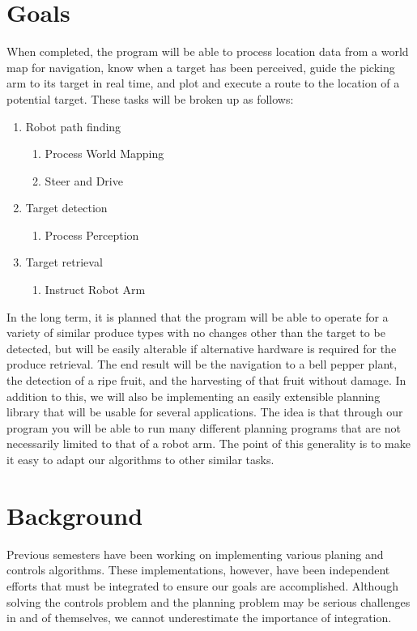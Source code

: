\documentclass[titlepage]{article}
\begin{document}
\section{Goals}
When completed, the program will be able to process location data from a world map for navigation, know when a target has been perceived, guide the picking arm to its target in real time, and plot and execute a route to the location of a potential target. These tasks will be broken up as follows:
\begin{enumerate}
\item Robot path finding
\begin{enumerate}
\item Process World Mapping
\item Steer and Drive
\end{enumerate}
\item Target detection
\begin{enumerate}
\item Process Perception
\end{enumerate}
\item Target retrieval
\begin{enumerate}
\item Instruct Robot Arm
\end{enumerate}
\end{enumerate}
In the long term, it is planned that the program will be able to operate for a variety of similar produce types with no changes other than the target to be detected, but will be easily alterable if alternative hardware is required for the produce retrieval. The end result will be the navigation to a bell pepper plant, the detection of a ripe fruit, and the harvesting of that fruit without damage.
In addition to this, we will also be implementing an easily extensible planning library that will be usable for several applications. The idea is that through our program you will be able to run many different planning programs that are not necessarily limited to that of a robot arm. The point of this generality is to make it easy to adapt our algorithms to other similar tasks.
\section{Background}
Previous semesters have been working on implementing various planing and controls algorithms. These implementations, however, have been independent efforts that must be integrated to ensure our goals are accomplished. Although solving the controls problem and the planning problem may be serious challenges in and of themselves, we cannot underestimate the importance of integration.
\end{document}
